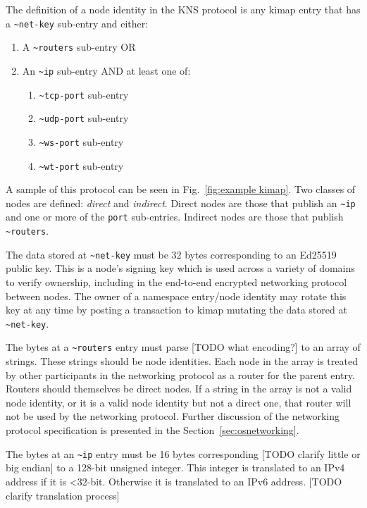 \documentclass[runningheads]{llncs}
\begin{document}
The definition of a node identity in the KNS protocol is any kimap entry that has a \verb|~net-key| sub-entry and either:
\begin{enumerate}
\item A \verb|~routers| sub-entry OR
\item An \verb|~ip| sub-entry AND at least one of:
	\begin{enumerate}
	\item \verb|~tcp-port| sub-entry
	\item \verb|~udp-port| sub-entry
	\item \verb|~ws-port| sub-entry
	\item \verb|~wt-port| sub-entry
	\end{enumerate}
\end{enumerate}

A sample of this protocol can be seen in Fig.~\ref{fig:example kimap}.
Two classes of nodes are defined: \textit{direct} and \textit{indirect}.
Direct nodes are those that publish an \verb|~ip| and one or more of the \verb|port| sub-entries.
Indirect nodes are those that publish \verb|~routers|. %

The data stored at \verb|~net-key| must be 32 bytes corresponding to an Ed25519 public key.
This is a node's signing key which is used across a variety of domains to verify ownership, including in the end-to-end encrypted networking protocol between nodes.
The owner of a namespace entry/node identity may rotate this key at any time by posting a transaction to kimap mutating the data stored at \verb|~net-key|.

The bytes at a \verb|~routers| entry must parse [TODO what encoding?] to an array of strings.
These strings should be node identities.
Each node in the array is treated by other participants in the networking protocol as a router for the parent entry.
Routers should themselves be direct nodes.
If a string in the array is not a valid node identity, or it is a valid node identity but not a direct one, that router will not be used by the networking protocol.
Further discussion of the networking protocol specification is presented in the Section~\ref{sec:osnetworking}.

The bytes at an \verb|~ip| entry must be 16 bytes corresponding [TODO clarify little or big endian] to a 128-bit unsigned integer.
This integer is translated to an IPv4 address if it is <32-bit.
Otherwise it is translated to an IPv6 address. [TODO clarify translation process]
\end{document}
